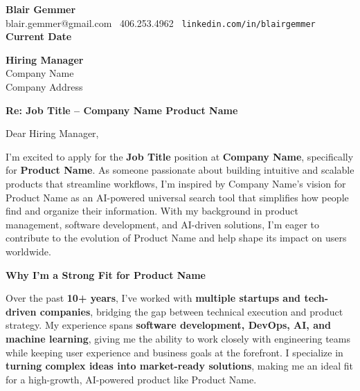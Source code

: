 \documentclass[a4paper,10.5pt]{article}
\makeatletter
\newcommand{\applicantName}{Blair Gemmer}
\newcommand{\applicantEmail}{blair.gemmer@gmail.com }
\newcommand{\applicantPhone}{406.253.4962 }
\newcommand{\linkedinURL}{\texttt{linkedin.com/in/blairgemmer}}
\newcommand{\applicationDate}{Current Date}
\newcommand{\companyName}{Company Name}
\newcommand{\hiringManager}{Hiring Manager}
\newcommand{\companyAddress}{Company Address}
\newcommand{\jobTitle}{Job Title}
\newcommand{\productName}{Product Name}
\makeatother
\begin{document}
\begin{flushleft}
\textbf{\large \applicantName} \\
\applicantEmail \textbar\ \applicantPhone \textbar\ \linkedinURL \\
\textbf{\applicationDate}  
\end{flushleft}

\begin{flushleft}
\textbf{\hiringManager} \\
\companyName \\  
\companyAddress  
\end{flushleft}

\vspace{0.5cm}

\noindent
\textbf{Re: \jobTitle{} -- \companyName{} \productName{}}

\vspace{0.5cm}

\noindent
Dear \hiringManager,

\vspace{0.5cm}

I’m excited to apply for the \textbf{\jobTitle} position at \textbf{\companyName}, specifically for \textbf{\productName}. As someone passionate about building intuitive and scalable products that streamline workflows, I’m inspired by \companyName’s vision for \productName{} as an AI-powered universal search tool that simplifies how people find and organize their information. With my background in product management, software development, and AI-driven solutions, I’m eager to contribute to the evolution of \productName{} and help shape its impact on users worldwide.

\vspace{0.5cm}

\noindent
\textbf{Why I’m a Strong Fit for \productName}

Over the past \textbf{10+ years}, I’ve worked with \textbf{multiple startups and tech-driven companies}, bridging the gap between technical execution and product strategy. My experience spans \textbf{software development, DevOps, AI, and machine learning}, giving me the ability to work closely with engineering teams while keeping user experience and business goals at the forefront. I specialize in \textbf{turning complex ideas into market-ready solutions}, making me an ideal fit for a high-growth, AI-powered product like \productName.
\end{document}
